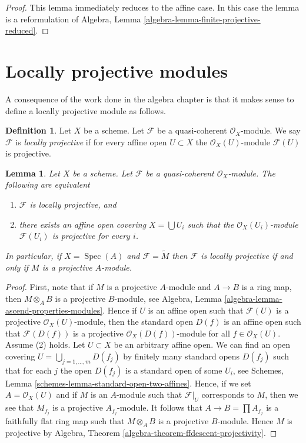 \documentclass{stacks-project}
\theoremstyle{plain}
\newtheorem{lemma}[subsection]{Lemma}
\theoremstyle{definition}
\newtheorem{definition}[subsection]{Definition}
\theoremstyle{remark}
\numberwithin{equation}{subsection}
\def\Spec{\mathop{\mathrm{Spec}}}
\begin{document}
\begin{proof}
This lemma immediately reduces to the affine case.
In this case the lemma is a reformulation of
Algebra, Lemma \ref{algebra-lemma-finite-projective-reduced}.
\end{proof}




\section{Locally projective modules}
\label{section-locally-projective}

\noindent
A consequence of the work done in the algebra chapter is that it
makes sense to define a locally projective module as follows.

\begin{definition}
\label{definition-locally-projective}
Let $X$ be a scheme. Let $\mathcal{F}$ be a quasi-coherent
$\mathcal{O}_X$-module. We say $\mathcal{F}$ is {\it locally projective}
if for every affine open $U \subset X$ the $\mathcal{O}_X(U)$-module
$\mathcal{F}(U)$ is projective.
\end{definition}

\begin{lemma}
\label{lemma-locally-projective}
Let $X$ be a scheme.
Let $\mathcal{F}$ be a quasi-coherent $\mathcal{O}_X$-module.
The following are equivalent
\begin{enumerate}
\item $\mathcal{F}$ is locally projective, and
\item there exists an affine open covering $X = \bigcup U_i$
such that the $\mathcal{O}_X(U_i)$-module
$\mathcal{F}(U_i)$ is projective for every $i$.
\end{enumerate}
In particular, if $X = \Spec(A)$ and $\mathcal{F} = \widetilde{M}$
then $\mathcal{F}$ is locally projective if and only if $M$ is a projective
$A$-module.
\end{lemma}

\begin{proof}
First, note that if $M$ is a projective $A$-module and $A \to B$ is a
ring map, then $M \otimes_A B$ is a projective $B$-module, see
Algebra, Lemma \ref{algebra-lemma-ascend-properties-modules}.
Hence if $U$ is an affine open such that $\mathcal{F}(U)$ is a projective
$\mathcal{O}_X(U)$-module, then the standard open $D(f)$ is an
affine open such that $\mathcal{F}(D(f))$ is a projective
$\mathcal{O}_X(D(f))$-module for all $f \in \mathcal{O}_X(U)$.
Assume (2) holds. Let $U \subset X$ be an arbitrary affine open.
We can find an open covering $U = \bigcup_{j = 1, \ldots, m} D(f_j)$
by finitely many standard opens $D(f_j)$ such that for each
$j$ the open $D(f_j)$ is a standard open of some $U_i$, see
Schemes, Lemma \ref{schemes-lemma-standard-open-two-affines}.
Hence, if we set $A = \mathcal{O}_X(U)$ and if $M$ is an $A$-module
such that $\mathcal{F}|_U$ corresponds to $M$, then we see that
$M_{f_j}$ is a projective $A_{f_j}$-module. It follows that
$A \to B = \prod A_{f_j}$ is a faithfully flat ring map
such that $M \otimes_A B$ is a projective $B$-module.
Hence $M$ is projective by
Algebra, Theorem \ref{algebra-theorem-ffdescent-projectivity}.
\end{proof}
\end{document}
